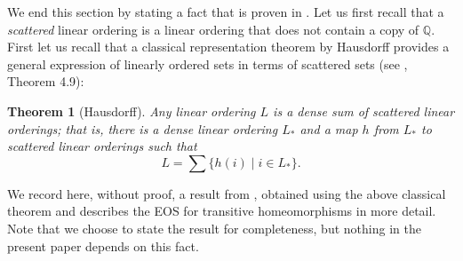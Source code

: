\documentclass[10pt,a4paper]{article}
\theoremstyle{definition}
\theoremstyle{remark}
\theoremstyle{plain}
\newtheorem{thm}[defi]{Theorem}
\begin{document}


We end this section by stating a fact that is proven in \cite{CFL}. Let us first recall that a \emph{scattered} linear ordering is a linear ordering that does not contain a copy of $\mathbb{Q}$. First let us recall that a classical representation theorem by Hausdorff provides a general expression of linearly ordered sets in terms of scattered sets (see \cite{rosenstein}, Theorem 4.9):

\begin{thm}[Hausdorff]
Any linear ordering \( L \) is a dense sum of scattered linear orderings; that is, there is a dense linear ordering \( L_* \) and a map \( h \) from \( L_* \) to scattered linear orderings such that $$ L = \sum \{ h(i) \mid i \in L_* \}. $$
\end{thm} 

We record here, without proof, a result from \cite{CFL}, obtained using the above classical theorem and describes the EOS for transitive homeomorphisms in more detail. Note that we choose to state the result for completeness, but nothing in the present paper depends on this fact.
\end{document}
